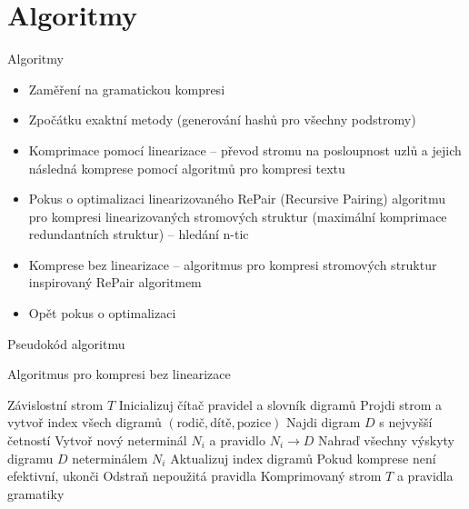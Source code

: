 \documentclass[lualatex,hyperref={pdfencoding=auto}]{beamer}
\begin{document}
\section{Algoritmy}
\begin{frame}{Algoritmy}
  \begin{itemize}
    \item Zaměření na gramatickou kompresi
    \item Zpočátku exaktní metody (generování hashů pro všechny podstromy)
    \item Komprimace pomocí linearizace -- převod stromu na posloupnost uzlů a jejich následná komprese pomocí algoritmů pro kompresi textu \nocite{McAnlis2016}
    \item Pokus o optimalizaci linearizovaného RePair (Recursive Pairing) algoritmu pro kompresi linearizovaných stromových struktur (maximální komprimace redundantních struktur) -- hledání n-tic
    \item Komprese bez linearizace -- algoritmus pro kompresi stromových struktur inspirovaný RePair algoritmem 
    \item Opět pokus o optimalizaci
  \end{itemize}
\end{frame}

\begin{frame}{Pseudokód algoritmu}
\begin{algorithm}[H]
\caption{Algoritmus pro kompresi bez linearizace} 
\begin{algorithmic}[1] 
  \REQUIRE Závislostní strom $T$ 
  \STATE Inicializuj čítač pravidel a slovník digramů 
  \STATE Projdi strom a vytvoř index všech digramů $(\text{rodič}, \text{dítě}, \text{pozice})$ 
  \STATE Najdi digram $D$ s nejvyšší četností 
  \STATE Vytvoř nový neterminál $N_i$ a pravidlo $N_i 
  \rightarrow D$ 
  \STATE Nahraď všechny výskyty digramu $D$ neterminálem $N_i$ 
  \STATE Aktualizuj index digramů 
  \STATE Pokud komprese není efektivní, ukonči 
  \ENDWHILE 
  \STATE Odstraň nepoužitá pravidla 
  \RETURN Komprimovaný strom $T$ a pravidla gramatiky 
\end{algorithmic} 
\end{algorithm}

\end{frame}
\end{document}
